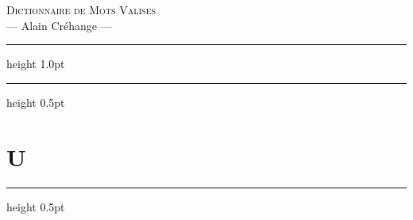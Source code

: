 \documentclass[10pt,a4paper,twoside]{article} %
\newcommand{\SetLetter}[1]{%
  \ifcsname letter#1true\endcsname
    \csname letter#1true\endcsname
  \fi
}
\newcounter{Uletter}\renewcommand{\theUletter}{U}
\newcommand{\entry}[6]{%
    \SetLetter{#1}%
    \vspace*{1mm}%
    \color{entrycolor}%
    \markboth{#1}{#1}%
    \textbf{#1}%
    \color{defcolor}%
    \ {#2}%
    \ \textit{#3}%
    \ $\bullet$\ {#4}%
    {#5}%
    {#6}%
}
\let\oldcenter\center
\let\oldendcenter\endcenter
\renewenvironment{center}{\setlength\topsep{-5pt}\oldcenter}{\oldendcenter}
\begin{document}
\begin{center}
    \Large{\lettrine[lines=1]{\color{titlecolor}D}{ictionnaire de Mots Valises}}\\
    \small{--- Alain Créhange ---}
\end{center}
\vspace{4mm}
\hrule height 1.0pt
\vspace{0mm}

\hrule height 0.5pt

\section*{U}
\label{s:Uletter}

\hrule height 0.5pt



\end{document}
